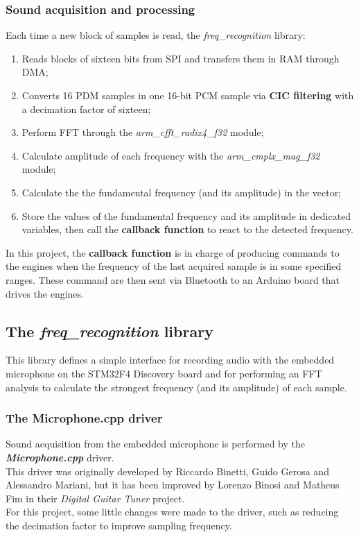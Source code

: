 \subsubsection{Sound acquisition and processing}
Each time a new block of samples is read, the \textit{freq\_recognition} library:
\begin{enumerate}
	\item Reads blocks of sixteen bits from SPI and transfers them in RAM through DMA;
	\item Converts 16 PDM samples in one 16-bit PCM sample via \textbf{CIC filtering} with a decimation factor of sixteen;
	\item Perform FFT through the \textit{arm\_cfft\_radix4\_f32} module;
	\item Calculate amplitude of each frequency with the \textit{arm\_cmplx\_mag\_f32} module;
	\item Calculate the the fundamental frequency (and its amplitude) in the vector;
	\item Store the values of the fundamental frequency and its amplitude in dedicated variables, then call the \textbf{callback function} to react to the detected frequency.
\end{enumerate}
In this project, the \textbf{callback function} is in charge of producing commands to the engines when the frequency of the last acquired sample is in some specified ranges. These command are then sent via Bluetooth to an Arduino board that drives the engines.


\subsection{The \textit{freq\_recognition} library}
This library defines a simple interface for recording audio with the embedded microphone on the STM32F4 Discovery board and for performing an FFT analysis to calculate the strongest frequency (and its amplitude) of each sample.

\subsubsection{The Microphone.cpp driver}
Sound acquisition from the embedded microphone is performed by the \textbf{\textit{Microphone.cpp}} driver. \\
This driver was originally developed by Riccardo Binetti, Guido Gerosa and Alessandro Mariani, but it has been improved by Lorenzo Binosi and Matheus Fim in their \textit{Digital Guitar Tuner} project. \\
For this project, some little changes were made to the driver, such as reducing the decimation factor to improve sampling frequency.

